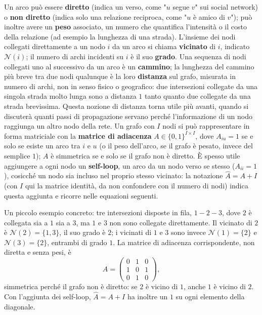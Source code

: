 Un arco può essere \textbf{diretto} (indica un verso, come "$u$ segue $v$"
sui social network) o \textbf{non diretto} (indica solo una relazione
reciproca, come "$u$ è amico di $v$"); può inoltre avere un \textbf{peso}
associato, un numero che quantifica l'intensità o il costo della
relazione (ad esempio la lunghezza di una strada). L'insieme dei nodi
collegati direttamente a un nodo $i$ da un arco si chiama
\textbf{vicinato} di $i$, indicato $\mathcal{N}(i)$; il numero di archi
incidenti su $i$ è il suo \textbf{grado}. Una sequenza di nodi collegati
uno al successivo da un arco è un \textbf{cammino}; la lunghezza del
cammino più breve tra due nodi qualunque è la loro \textbf{distanza} sul
grafo, misurata in numero di archi, non in senso fisico o geografico:
due intersezioni collegate da una singola strada molto lunga sono a
distanza $1$ tanto quanto due collegate da una strada brevissima. Questa
nozione di distanza torna utile più avanti, quando si discuterà quanti
passi di propagazione servano perché l'informazione di un nodo raggiunga
un altro nodo della rete. Un grafo con $I$ nodi si può
rappresentare in forma matriciale con la \textbf{matrice di adiacenza} $A
\in \{0,1\}^{I \times I}$, dove $A_{iu}=1$ se e solo se esiste un arco tra
$i$ e $u$ (o il peso dell'arco, se il grafo è pesato, invece del semplice
$1$); $A$ è simmetrica se e solo se il grafo non è diretto. È spesso utile
aggiungere a ogni nodo un \textbf{self-loop}, un arco da un nodo verso se
stesso ($A_{ii}=1$), cosicché un nodo sia incluso nel proprio stesso
vicinato: la notazione $\hat A = A + I$ (con $I$ qui la matrice identità,
da non confondere con il numero di nodi) indica questa aggiunta e ricorre
nelle equazioni seguenti.

Un piccolo esempio concreto: tre intersezioni disposte in fila, $1-2-3$,
dove $2$ è collegata sia a $1$ sia a $3$, ma $1$ e $3$ non sono collegate
direttamente. Il vicinato di $2$ è $\mathcal{N}(2) = \{1,3\}$, il suo
grado è $2$; i vicinati di $1$ e $3$ sono invece $\mathcal{N}(1)=\{2\}$ e
$\mathcal{N}(3)=\{2\}$, entrambi di grado $1$. La matrice di adiacenza
corrispondente, non diretta e senza pesi, è
\[A = \begin{pmatrix} 0&1&0 \\ 1&0&1 \\ 0&1&0 \end{pmatrix},\]
simmetrica perché il grafo non è diretto: se $2$ è vicino di $1$, anche
$1$ è vicino di $2$. Con l'aggiunta dei self-loop, $\hat A = A+I$ ha
inoltre un $1$ su ogni elemento della diagonale.

